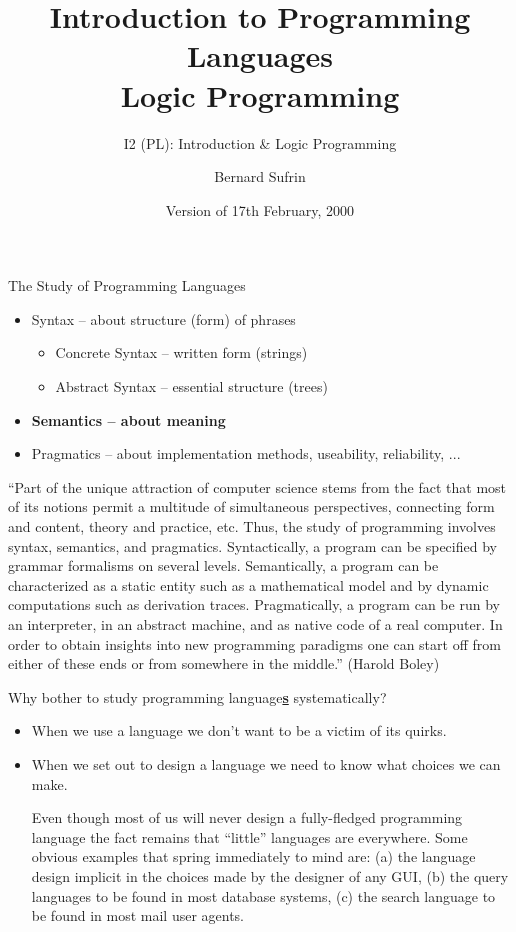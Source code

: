 \documentclass{popl}
\date{Version of 17th February, 2000}
\title{Introduction to Programming  Languages \\ Logic Programming}
\subtitle{I2 (PL): Introduction \& Logic Programming}
\author{Bernard Sufrin}
\begin{document}
\begin{foil}
\begin{cframed}
The Study of Programming Languages 
\end{cframed}

\begin{itemize}
\item Syntax    -- about structure (form) of phrases
\begin{itemize}
\item Concrete Syntax -- written form (strings)
\item Abstract Syntax -- essential structure (trees)
\end{itemize}
\item {\bf Semantics -- about meaning}
\item Pragmatics -- about implementation methods, useability, reliability, ...
\end{itemize}
\begin{note}
``Part of the unique attraction of computer science stems from the fact
that most of its notions permit a multitude of simultaneous
perspectives, connecting form and content, theory and practice, etc.
Thus, the study of programming involves syntax, semantics, and
pragmatics. Syntactically, a program can be specified by grammar
formalisms on several levels.  Semantically, a program can be
characterized as a static entity such as a mathematical model and by
dynamic computations such as derivation traces.  Pragmatically, a
program can be run by an interpreter, in an abstract machine, and as
native code of a real computer. In order to obtain insights into new
programming paradigms one can start off from either of these ends or
from somewhere in the middle.'' (Harold Boley) 
\end{note}
\end{foil}

\begin{foil} 
\begin{cframed}[5in]
Why bother to study programming language{\bf \underline{s}} systematically?
\end{cframed}

\begin{itemize}
        \item When we use a language we don't want to be a victim of its quirks.
        \item When we set out to design a language we need to know what choices we can make.
\begin{note}
Even though  most of us will never design a fully-fledged
programming language the fact remains that ``little'' languages
are everywhere. Some obvious examples that spring immediately to
mind are: (a) the language design implicit in the choices made
by the designer of any GUI, (b) the query languages to be found
in most database systems, (c) the search language to be 
found in most mail user agents.
\end{note}
\end{itemize}
\end{foil}
\end{document}
